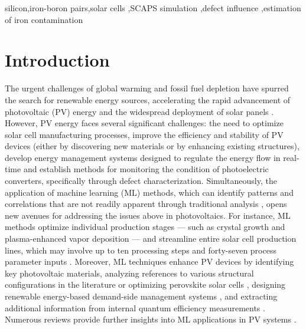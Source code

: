 \documentclass[a4paper,fleqn]{cas-sc}
\begin{document}
\begin{keywords}
 silicon\sep iron-boron pairs\sep solar cells \sep SCAPS simulation \sep defect influence \sep estimation of iron contamination
\end{keywords}

\maketitle

\section{Introduction}%
\par
The urgent challenges of global warming and fossil fuel depletion have spurred the search
for renewable energy sources, accelerating the rapid advancement of photovoltaic (PV) energy and the widespread deployment of solar panels \cite{Pata2024, Holechek2022}.
However, PV energy faces several significant challenges:
the need to optimize solar cell manufacturing processes,
improve the efficiency and stability of PV devices
(either by discovering new materials or by enhancing existing structures),
develop energy management systems designed to regulate the energy flow in real-time and
establish methods for monitoring the condition of photoelectric converters, specifically through defect characterization.
Simultaneously, the application of machine learning (ML) methods,
which can identify patterns and correlations that are not readily apparent through traditional analysis \cite{Park2022},
opens new avenues for addressing the issues above in photovoltaics.
For instance, ML methods optimize individual production stages ---
such as crystal growth \cite{Qi2020} and plasma-enhanced vapor deposition \cite{Rachdi2021} ---
and streamline entire solar cell production lines, which may involve up to ten processing steps and forty-seven process parameter inputs \cite{Buratti2020}.
Moreover, ML techniques enhance PV devices by identifying key photovoltaic materials,
analyzing references to various structural configurations in the literature \cite{Zhang2022} or
optimizing perovskite solar cells \cite{Liu2023},
designing renewable energy-based demand-side management systems \cite{Asghar2023},
and extracting additional information from internal quantum efficiency measurements \cite{AbdullahVetter2025}.
Numerous reviews provide further insights into ML applications in PV systems \cite{DiSabatino2024, Datta2023, Jaiswal2023, Buratti2024, Bhatti2023}.
\end{document}
